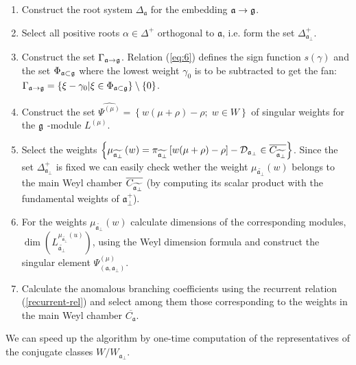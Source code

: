 \documentclass[preprint,12pt]{elsarticle}
\newcommand{\af}{\mathfrak{a}}
\newcommand{\afb}{\mathfrak{a}_{\bot}}
\begin{document}
\begin{enumerate}
\item  Construct the root system $\Delta _{\af}$ for the embedding $%
\af\rightarrow \frak{g}$.

\item  Select all positive roots $\alpha \in \Delta ^{+}$ orthogonal
to  $\af$, i.e. form the set $\Delta_{\afb }^{+}$.

\item  Construct the set $\Gamma _{\af\rightarrow \frak{g}}$. Relation
 (\ref{eq:6}) defines the sign function
 $s(\gamma)$ and the set $\Phi_{\af\subset \frak{g}}$ where the lowest weight
 $\gamma_0$ is to be subtracted to get the fan:
 $\Gamma _{\af\rightarrow \frak{g}}=\left\{ \xi -\gamma _{0}|\xi \in \Phi _{%
\af\subset \frak{g}}\right\} \setminus \left\{ 0\right\}$.

\item  Construct the set $\widehat{\Psi ^{(\mu )}}=\left\{ w (\mu +\rho
)-\rho ;\;w \in W\right\} $ of singular weights for the $\frak{g}$%
-module $L^{(\mu )}$.

\item  Select the weights $\left\{ \mu _{\widetilde{\af_{\perp }}%
}\left( w\right) =\pi _{\widetilde{\af_{\perp }}}\left[ w(\mu +\rho
)-\rho \right] -\mathcal{D}_{\af_{\perp }}\in \overline{C_{\widetilde{%
\af_{\perp }}}}\right\} $. Since the set $\Delta_{\afb }^{+}$ is fixed
we can easily check wether the weight $\mu _{\widetilde{\af_{\perp }}%
}\left( w\right) $ belongs to the main Weyl chamber $\overline{C_{\widetilde{%
\af_{\perp }}}}$ (by computing its scalar product with the fundamental
weights of $\afb^{+}$).

\item  For the weights $\mu _{\widetilde{\af_{\perp }}}\left( w\right) $
calculate dimensions of the corresponding modules, $\mathrm{\dim }\left(
L_{\widetilde{\af_{\perp }}}^{\mu _{\widetilde{\af_{\perp }}%
}\left( u\right) }\right) $, using the Weyl dimension formula and construct
the singular element $\Psi ^{\left( \mu \right) }_{\left(  \af, \afb \right)}$.

\item  Calculate the anomalous branching coefficients using the
recurrent relation (\ref{recurrent-rel}) and select among them those
corresponding to the weights in the main Weyl
chamber $\overline{C_{\af}}$.
\end{enumerate}

We can speed up the algorithm by
one-time computation of the representatives of the conjugate classes $%
W/W_{\afb }$.
\end{document}
